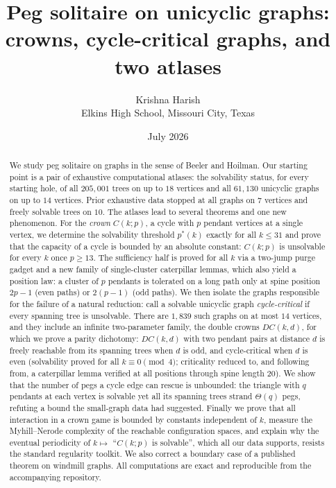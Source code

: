 \documentclass[11pt]{article}
\title{Peg solitaire on unicyclic graphs:\\ crowns, cycle-critical graphs, and two atlases}
\author{Krishna Harish\\[2pt]
\normalsize Elkins High School, Missouri City, Texas}
\date{July 2026}
\theoremstyle{definition}
\begin{document}
\maketitle

\begin{abstract}
We study peg solitaire on graphs in the sense of Beeler and Hoilman.
Our starting point is a pair of exhaustive computational atlases: the
solvability status, for every starting hole, of all $205{,}001$ trees
on up to $18$ vertices and all $61{,}130$ unicyclic graphs on up to
$14$ vertices. Prior exhaustive data stopped at all graphs on $7$
vertices and freely solvable trees on $10$. The atlases lead to
several theorems and one new phenomenon. For the \emph{crown}
$C(k;p)$, a cycle with $p$ pendant vertices at a single vertex, we
determine the solvability threshold $p^*(k)$ exactly for all
$k\le 31$ and prove that the capacity of a cycle is bounded by an
absolute constant: $C(k;p)$ is unsolvable for every $k$ once
$p\ge 13$. The sufficiency half is proved for all $k$ via a
two-jump purge gadget and a new family of single-cluster caterpillar
lemmas, which also yield a position law: a cluster of $p$ pendants is
tolerated on a long path only at spine position $2p-1$ (even paths)
or $2(p-1)$ (odd paths). We then isolate the graphs responsible for
the failure of a natural reduction: call a solvable unicyclic graph
\emph{cycle-critical} if every spanning tree is unsolvable. There
are $1{,}839$ such graphs on at most $14$ vertices, and they include an
infinite two-parameter family, the double crowns $DC(k,d)$, for which
we prove a parity dichotomy:
$DC(k,d)$ with two pendant pairs at distance $d$ is freely reachable
from its spanning trees when $d$ is odd, and cycle-critical when $d$
is even (solvability proved for all $k\equiv 0 \pmod 4$; criticality
reduced to, and following from, a caterpillar lemma verified at all
positions through spine length $20$). We show that the number of pegs
a cycle edge can rescue is unbounded: the triangle with $q$
pendants at each vertex is solvable yet all its spanning trees strand
$\Theta(q)$ pegs, refuting a bound the small-graph data had
suggested. Finally we prove that all interaction in a
crown game is bounded by constants independent of $k$, measure the
Myhill--Nerode complexity of the reachable configuration spaces, and
explain why the eventual periodicity of $k\mapsto$ ``$C(k;p)$ is
solvable'', which all our data supports, resists the standard
regularity toolkit. We also correct a boundary case of a published
theorem on windmill graphs. All computations are exact and
reproducible from the accompanying repository.
\end{abstract}
\end{document}
